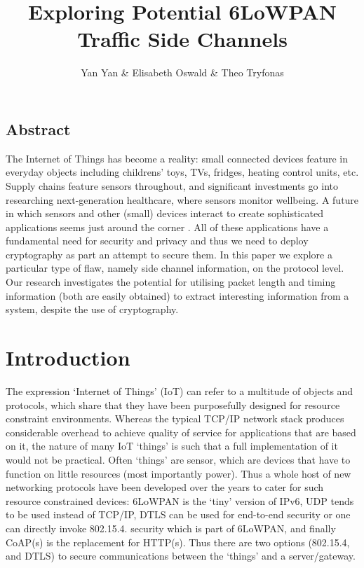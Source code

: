 \documentclass{article}
\title{Exploring Potential 6LoWPAN Traffic Side Channels}
\author{Yan Yan \& Elisabeth Oswald \& Theo Tryfonas}
\begin{document}
\maketitle


\subsection*{Abstract}
The Internet of Things has become a reality: small connected devices feature in everyday objects
including childrens' toys, TVs, fridges, heating control units, etc. Supply chains feature sensors
throughout, and significant investments go into researching next-generation healthcare, 
where sensors monitor wellbeing. A future in which sensors and other (small) devices interact to create sophisticated applications seems just around the corner . All of these applications have a fundamental need for security and privacy and thus we need to deploy cryptography as part an attempt to secure them. In this paper we explore a particular type of flaw, namely side channel information, on the protocol level. Our research investigates the potential for utilising packet length and timing information (both are easily obtained) to extract interesting information from a system, despite the use of cryptography. 


\section{Introduction}
The expression `Internet of Things' (IoT) can refer to a multitude of objects and protocols, which share that they have been purposefully designed for resource constraint environments. Whereas the typical TCP/IP network stack produces considerable overhead to achieve quality of service for applications that are based on it, the nature of many IoT `things' is such that a full implementation of it would not be practical. Often `things' are sensor, which are devices that have to function on little resources (most importantly power). Thus a whole host of new networking protocols have been developed over the years to cater for such resource constrained devices: 6LoWPAN is the `tiny' version of IPv6, UDP tends to be used instead of TCP/IP, DTLS can be used for end-to-end security or one can directly invoke 802.15.4. security which is part of 6LoWPAN, and finally CoAP(s) is the replacement for HTTP(s). Thus there are two options (802.15.4, and DTLS) to secure communications between the `things' and a server/gateway. 
\end{document}
